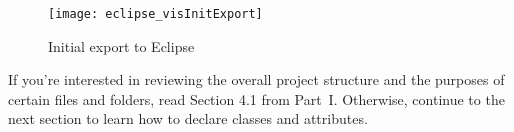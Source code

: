 \begin{stepbystep}
\clearpage

\vspace*{2cm}

\begin{figure}[htbp]
	\centering
  \texttt{[image: eclipse\_visInitExport]}
	\caption{Initial export to Eclipse}
	\label{eclipse:initExport}
\end{figure}

\vspace{1cm}

\item If you're interested in reviewing the overall project structure and the purposes of certain files and folders, read Section 4.1
from Part~I. Otherwise, continue to the next section to learn how to declare classes and attributes.

\end{stepbystep}
